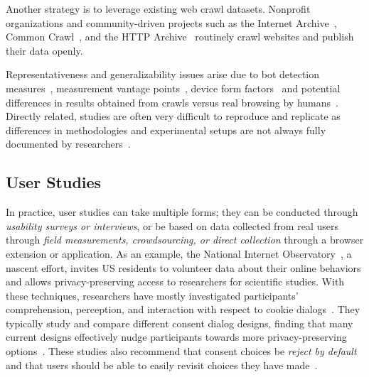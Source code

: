Another strategy is to leverage existing web crawl datasets. Nonprofit organizations and community-driven projects such as the Internet Archive~\cite{InternetArchiveDigital}, Common Crawl~\cite{commoncrawlCommonCrawlOpen}, and the HTTP Archive~\cite{httparchiveHTTPArchive} routinely crawl websites and publish their data openly.

 Representativeness and generalizability issues arise due to 
bot detection measures~\cite{krumnowHowGullibleAre2022},
measurement vantage points~\cite{samarasingheGlobalPerspectiveWeb2019},
device form factors~\cite{yangComparativeMeasurementStudy2020,casselOmniCrawlComprehensiveMeasurement2022}
and potential differences in results obtained from crawls versus real browsing by humans~\cite{zeberRepresentativenessAutomatedWeb2020}. Directly related, studies are often very difficult to reproduce and replicate as differences in methodologies and experimental setups are not always fully documented by researchers~\cite{demirReproducibilityReplicabilityWeb2022,hantkeWebExecutionBundles2025}.


\vspace{-2mm}
\subsection{User Studies}
\label{sec:user-studies}
\vspace{-3mm}

In practice, user studies can take multiple forms; they can be conducted through \textit{usability surveys or interviews}, or be based on data collected from real users through \textit{field measurements, crowdsourcing, or direct collection} through a browser extension or application. As an example, the National Internet Observatory~\cite{steningUnprecedentedDataCollection2022,nioNationalInternetObservatory,callahanCanWeBetter2021,fealIntroductionNationalInternet2024}, a nascent effort, invites US residents to volunteer data about their online behaviors and allows privacy-preserving access to researchers for scientific studies.
%
With these techniques, researchers have mostly investigated participants’ comprehension, perception, and interaction with respect to cookie  dialogs~\cite{birrellSoKTechnicalImplementation2024,machuletzMultiplePurposesMultiple2020,bermejofernandezThisWebsiteUses2021,habibOkayWhateverEvaluation2022,singhWhatCookieConsent2022,bielovaSurveyAcademicStudies2022,Bielova2024-zr}. They typically study and compare different consent dialog designs, finding that many current designs effectively nudge participants towards more privacy-preserving options~\cite{machuletzMultiplePurposesMultiple2020,bermejofernandezThisWebsiteUses2021}. These studies also recommend that consent choices be \textit{reject by default} and that users should be able to easily revisit choices they have made~\cite{habibOkayWhateverEvaluation2022,Kanc-etal-25-PETs}.


